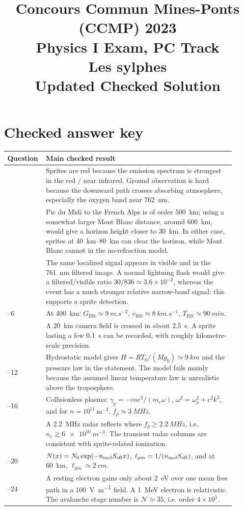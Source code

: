 \documentclass[11pt,a4paper]{article}
\title{Concours Commun Mines-Ponts (CCMP) 2023\\[0.25em]
\large Physics I Exam, PC Track\\[0.8em]
\Large Les sylphes\\[0.25em]
\large Updated Checked Solution}
\author{}
\date{}
\newcommand{\ISS}{\mathrm{ISS}}
\begin{document}
\maketitle

\tableofcontents
\newpage

\section*{Checked answer key}

\begin{longtable}{>{\raggedright\arraybackslash}p{0.12\linewidth}>{\raggedright\arraybackslash}p{0.80\linewidth}}
\toprule
\textbf{Question} & \textbf{Main checked result}\\
\midrule
1 & Sprites are red because the emission spectrum is strongest in the red / near infrared. Ground observation is hard because the downward path crosses absorbing atmosphere, especially the oxygen band near \SI{762}{nm}.\\
2 & Pic du Midi to the French Alps is of order \SI{500}{km}; using a somewhat larger Mont Blanc distance, around \SI{600}{km}, would give a horizon height closer to \SI{30}{km}. In either case, sprites at \SIrange{40}{80}{km} can clear the horizon, while Mont Blanc cannot in the no-refraction model.\\
3 & The same localized signal appears in visible and in the \SI{761}{nm} filtered image. A normal lightning flash would give a filtered/visible ratio $30/836\simeq3.6\times10^{-2}$, whereas the event has a much stronger relative narrow-band signal: this supports a sprite detection.\\
4--6 & At \SI{400}{km}: $G_{\ISS}\simeq \SI{9}{m.s^{-2}}$, $v_{\ISS}\simeq \SI{8}{km.s^{-1}}$, $T_{\ISS}\simeq \SI{90}{min}$.\\
7 & A \SI{20}{km} camera field is crossed in about \SI{2.5}{s}. A sprite lasting a few \SI{0.1}{s} can be recorded, with roughly kilometre-scale precision.\\
8--12 & Hydrostatic model gives $H=RT_0/(Mg_0)\simeq \SI{9}{km}$ and the pressure law in the statement. The model fails mainly because the assumed linear temperature law is unrealistic above the troposphere.\\
13--16 & Collisionless plasma: $\gamma_p=-i n e^2/(m_e\omega)$, $\omega^2=\omega_p^2+c^2k^2$, and for $n=10^{11}\,\mathrm{m^{-3}}$, $f_p\simeq\SI{3}{MHz}$.\\
17 & A \SI{2.2}{MHz} radar reflects where $f_p\geq\SI{2.2}{MHz}$, i.e. $n_e\gtrsim \SI{6e10}{m^{-3}}$. The transient radar columns are consistent with sprite-related ionization.\\
18--20 & $N(x)=N_0\exp(-n_{\rm mol}S_{\rm eff}x)$, $\ell_{pm}=1/(n_{\rm mol}S_{\rm eff})$, and at \SI{60}{km}, $\ell_{pm}\simeq\SI{2}{cm}$.\\
21--24 & A resting electron gains only about \SI{2}{eV} over one mean free path in a \SI{100}{V.m^{-1}} field. A \SI{1}{MeV} electron is relativistic. The avalanche stage number is $\mathcal{N}\simeq35$, i.e. order $4\times10^1$.\\
\bottomrule
\end{longtable}
\end{document}
